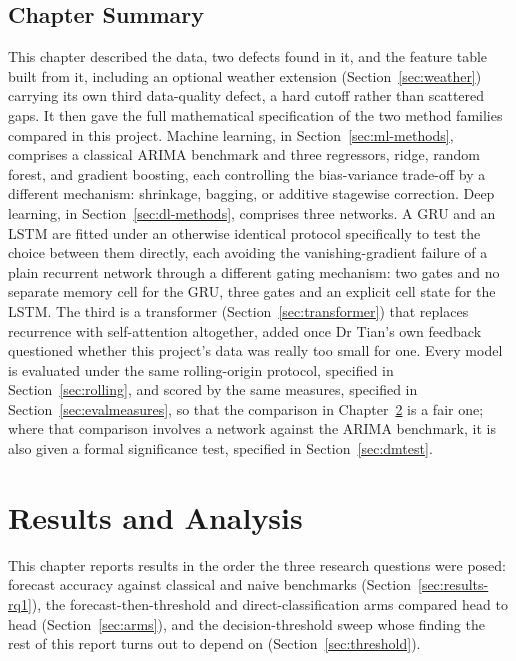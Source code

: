 \documentclass[12pt,a4paper]{report}
\begin{document}
\section{Chapter Summary}

This chapter described the data, two defects found in it, and the feature
table built from it, including an optional weather extension
(Section~\ref{sec:weather}) carrying its own third data-quality defect, a
hard cutoff rather than scattered gaps. It then gave the full mathematical
specification of the two method families compared in this project. Machine
learning, in Section~\ref{sec:ml-methods}, comprises a classical ARIMA
benchmark and three regressors, ridge, random forest, and gradient boosting,
each controlling the bias-variance trade-off by a different mechanism:
shrinkage, bagging, or additive stagewise correction. Deep learning, in
Section~\ref{sec:dl-methods}, comprises three networks. A GRU and an LSTM are
fitted under an otherwise identical protocol specifically to test the choice
between them directly, each avoiding the vanishing-gradient failure of a
plain recurrent network through a different gating mechanism: two gates and
no separate memory cell for the GRU, three gates and an explicit cell state
for the LSTM. The third is a transformer (Section~\ref{sec:transformer}) that
replaces recurrence with self-attention altogether, added once Dr Tian's own
feedback questioned whether this project's data was really too small for one.
Every model is evaluated under the same rolling-origin protocol, specified in
Section~\ref{sec:rolling}, and scored by the same measures, specified in
Section~\ref{sec:evalmeasures}, so that the comparison in
Chapter~\ref{chap:results} is a fair one; where that comparison involves a
network against the ARIMA benchmark, it is also given a formal significance
test, specified in Section~\ref{sec:dmtest}.

\chapter{Results and Analysis}
\label{chap:results}

This chapter reports results in the order the three research questions were
posed: forecast accuracy against classical and naive benchmarks
(Section~\ref{sec:results-rq1}), the forecast-then-threshold and
direct-classification arms compared head to head (Section~\ref{sec:arms}),
and the decision-threshold sweep whose finding the rest of this report turns
out to depend on (Section~\ref{sec:threshold}).
\end{document}
